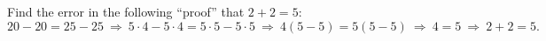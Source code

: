 Find the error in the following ``proof'' that $2+2=5$:
\[
20-20=25-25\ \Longrightarrow\ 5\cdot4-5\cdot4=5\cdot5-5\cdot5\ \Longrightarrow\ 4(5-5)=5(5-5)\ \Longrightarrow\ 4=5\ \Longrightarrow\ 2+2=5 .
\]
